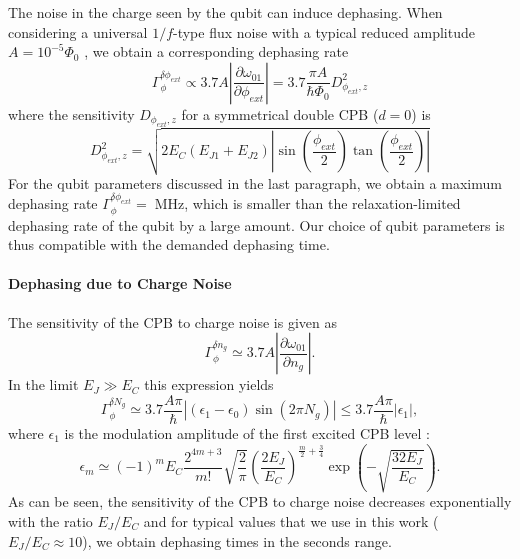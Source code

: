 The noise in the charge seen by the qubit can induce dephasing. When considering a universal $1/f$-type flux noise with a typical reduced amplitude $A=10^{-5}\Phi_0$ \citep{koch_charge-insensitive_2007}, we obtain a corresponding dephasing rate
%
\begin{equation}
\Gamma_\phi^{\delta \phi_{ext}} \propto 3.7A\left|\frac{\partial \omega_{01}}{\partial \phi_{ext}}\right| = 3.7\frac{\pi A}{\hbar \Phi_0}D_{\phi_{ext},z}^2
\end{equation}
%
where the sensitivity $D_{\phi_{ext},z}$ for a symmetrical double CPB ($d=0$) is
%
\begin{equation}
D_{\phi_{ext},z}^2 = \sqrt{2E_C(E_{J1}+E_{J2})\left|\sin{\left(\frac{\phi_{ext}}{2}\right)}\tan{\left(\frac{\phi_{ext}}{2}\right)}\right|}
\end{equation}
%
For the qubit parameters discussed in the last paragraph, we obtain a maximum dephasing rate $\Gamma_\phi^{\delta \phi_{ext}}=\;\mathrm{MHz}$, which is smaller than the relaxation-limited dephasing rate of the qubit by a large amount. Our choice of qubit parameters is thus compatible with the demanded dephasing time.

\paragraph{Dephasing due to Charge Noise}

The sensitivity of the CPB to charge noise is given as	
%
\begin{equation}
\Gamma_\phi^{\delta n_g} \simeq 3.7A \left|\frac{\partial \omega_{01}}{\partial n_g}\right|.
\end{equation}
%
In the limit $E_J\gg E_C$ this expression yields
%
\begin{equation}
\Gamma_\phi^{\delta N_g} \simeq 3.7\frac{A\pi}{\hbar}\left| (\epsilon_1-\epsilon_0)\sin{\left(2\pi N_g\right)}\right| \leq 3.7\frac{A\pi}{\hbar}|\epsilon_1|,
\end{equation}
%
where $\epsilon_1$ is the modulation amplitude of the first excited CPB level \citep{koch_charge-insensitive_2007}:
%
\begin{equation}
\epsilon_m\simeq (-1)^m E_C\frac{2^{4m+3}}{m!}\sqrt{\frac{2}{\pi}}\left(\frac{2E_J}{E_C}\right)^{\frac{m}{2}+\frac{3}{4}}\exp{\left(-\sqrt{\frac{32E_J}{E_C}}\right)}.
\end{equation}
%
As can be seen, the sensitivity of the CPB to charge noise decreases exponentially with the ratio $E_J/E_C$ and for typical values that we use in this work ($E_J/E_C\approx 10$), we obtain dephasing times in the seconds range. 

